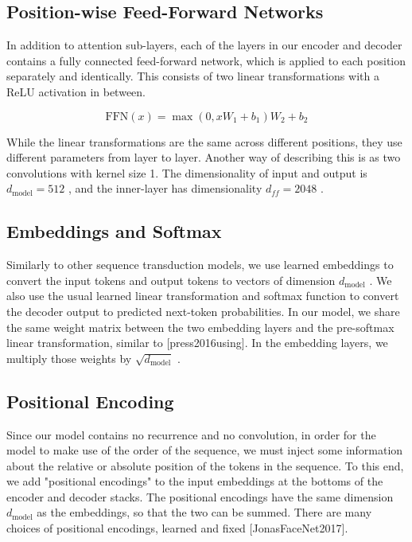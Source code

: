 \documentclass[11pt,a4paper]{article}
\begin{document}
\subsection{Position-wise Feed-Forward Networks}

In addition to attention sub-layers, each of the layers in our encoder and decoder contains a fully connected feed-forward network, which is applied to each position separately and identically.  This consists of two linear transformations with a ReLU activation in between.

$$\begin{equation}
   \mathrm{FFN}(x)=\max(0, xW_1 + b_1) W_2 + b_2
\end{equation}$$

While the linear transformations are the same across different positions, they use different parameters from layer to layer. Another way of describing this is as two convolutions with kernel size 1.  The dimensionality of input and output is  $d_{\text{model}}=512$ , and the inner-layer has dimensionality  $d_{ff}=2048$ .

\subsection{Embeddings and Softmax}

Similarly to other sequence transduction models, we use learned embeddings to convert the input tokens and output tokens to vectors of dimension  $d_{\text{model}}$ .  We also use the usual learned linear transformation and softmax function to convert the decoder output to predicted next-token probabilities.  In our model, we share the same weight matrix between the two embedding layers and the pre-softmax linear transformation, similar to [press2016using].   In the embedding layers, we multiply those weights by  $\sqrt{d_{\text{model}}}$ .

\subsection{Positional Encoding}

Since our model contains no recurrence and no convolution, in order for the model to make use of the order of the sequence, we must inject some information about the relative or absolute position of the tokens in the sequence.  To this end, we add "positional encodings" to the input embeddings at the bottoms of the encoder and decoder stacks.  The positional encodings have the same dimension  $d_{\text{model}}$  as the embeddings, so that the two can be summed.   There are many choices of positional encodings, learned and fixed [JonasFaceNet2017].
\end{document}
